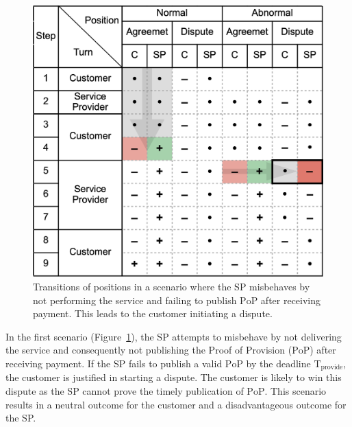 \documentclass[pdftex,twocolumn,epjc3]{svjour3}
\begin{document}
{\begin{figure}[h!]
\includegraphics[width=\linewidth]{misbehaviour.png}
\centering
\caption{Transitions of positions in a scenario where the SP misbehaves by not performing the service and failing to publish $\mathrm{PoP}$ after receiving payment. This leads to the customer initiating a dispute.}
\label{fig:misbehaviour}
\end{figure}

In the first scenario (Figure~\ref{fig:misbehaviour}), the SP attempts to misbehave by not delivering the service and consequently not publishing the Proof of Provision ($\mathrm{PoP}$) after receiving payment. If the SP fails to publish a valid $\mathrm{PoP}$ by the deadline $\mathrm{T}_\mathrm{provide}$, the customer is justified in starting a dispute. The customer is likely to win this dispute as the SP cannot prove the timely publication of $\mathrm{PoP}$. This scenario results in a neutral outcome for the customer and a disadvantageous outcome for the SP.

}
\end{document}
